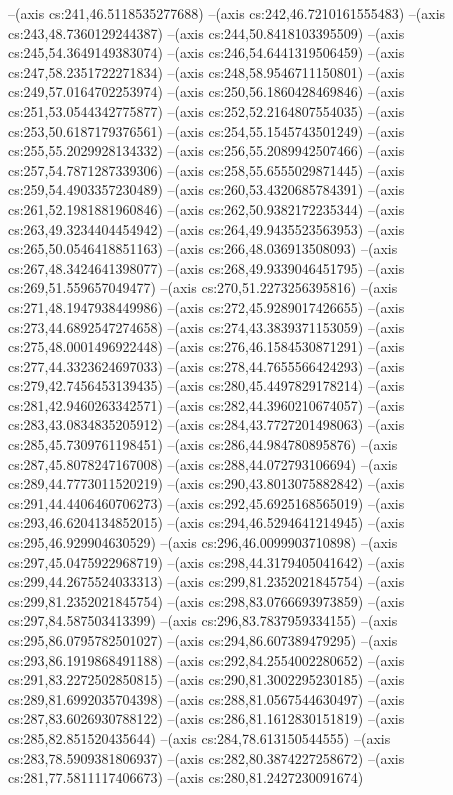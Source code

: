 --(axis cs:241,46.5118535277688)
--(axis cs:242,46.7210161555483)
--(axis cs:243,48.7360129244387)
--(axis cs:244,50.8418103395509)
--(axis cs:245,54.3649149383074)
--(axis cs:246,54.6441319506459)
--(axis cs:247,58.2351722271834)
--(axis cs:248,58.9546711150801)
--(axis cs:249,57.0164702253974)
--(axis cs:250,56.1860428469846)
--(axis cs:251,53.0544342775877)
--(axis cs:252,52.2164807554035)
--(axis cs:253,50.6187179376561)
--(axis cs:254,55.1545743501249)
--(axis cs:255,55.2029928134332)
--(axis cs:256,55.2089942507466)
--(axis cs:257,54.7871287339306)
--(axis cs:258,55.6555029871445)
--(axis cs:259,54.4903357230489)
--(axis cs:260,53.4320685784391)
--(axis cs:261,52.1981881960846)
--(axis cs:262,50.9382172235344)
--(axis cs:263,49.3234404454942)
--(axis cs:264,49.9435523563953)
--(axis cs:265,50.0546418851163)
--(axis cs:266,48.036913508093)
--(axis cs:267,48.3424641398077)
--(axis cs:268,49.9339046451795)
--(axis cs:269,51.559657049477)
--(axis cs:270,51.2273256395816)
--(axis cs:271,48.1947938449986)
--(axis cs:272,45.9289017426655)
--(axis cs:273,44.6892547274658)
--(axis cs:274,43.3839371153059)
--(axis cs:275,48.0001496922448)
--(axis cs:276,46.1584530871291)
--(axis cs:277,44.3323624697033)
--(axis cs:278,44.7655566424293)
--(axis cs:279,42.7456453139435)
--(axis cs:280,45.4497829178214)
--(axis cs:281,42.9460263342571)
--(axis cs:282,44.3960210674057)
--(axis cs:283,43.0834835205912)
--(axis cs:284,43.7727201498063)
--(axis cs:285,45.7309761198451)
--(axis cs:286,44.984780895876)
--(axis cs:287,45.8078247167008)
--(axis cs:288,44.072793106694)
--(axis cs:289,44.7773011520219)
--(axis cs:290,43.8013075882842)
--(axis cs:291,44.4406460706273)
--(axis cs:292,45.6925168565019)
--(axis cs:293,46.6204134852015)
--(axis cs:294,46.5294641214945)
--(axis cs:295,46.929904630529)
--(axis cs:296,46.0099903710898)
--(axis cs:297,45.0475922968719)
--(axis cs:298,44.3179405041642)
--(axis cs:299,44.2675524033313)
--(axis cs:299,81.2352021845754)
--(axis cs:299,81.2352021845754)
--(axis cs:298,83.0766693973859)
--(axis cs:297,84.587503413399)
--(axis cs:296,83.7837959334155)
--(axis cs:295,86.0795782501027)
--(axis cs:294,86.607389479295)
--(axis cs:293,86.1919868491188)
--(axis cs:292,84.2554002280652)
--(axis cs:291,83.2272502850815)
--(axis cs:290,81.3002295230185)
--(axis cs:289,81.6992035704398)
--(axis cs:288,81.0567544630497)
--(axis cs:287,83.6026930788122)
--(axis cs:286,81.1612830151819)
--(axis cs:285,82.851520435644)
--(axis cs:284,78.613150544555)
--(axis cs:283,78.5909381806937)
--(axis cs:282,80.3874227258672)
--(axis cs:281,77.5811117406673)
--(axis cs:280,81.2427230091674)
